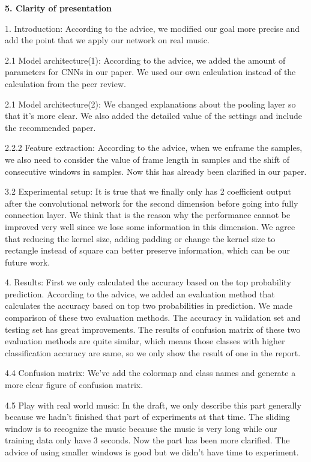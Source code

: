 \documentclass{article}
\begin{document}
\noindent \textbf{5. Clarity of presentation}

1. Introduction: According to the advice, we modified our goal more precise and add the point that we apply our network on real music.

2.1 Model architecture(1): According to the advice, we added the amount of parameters for CNNs in our paper. We used our own calculation instead of the calculation from the peer review.

2.1 Model architecture(2): We changed explanations about the pooling layer so that it's more clear. We also added the detailed value of the settings and include the recommended paper.

2.2.2 Feature extraction: According to the advice, when we enframe the samples, we also need to consider the value of frame length in samples and the shift of consecutive windows in samples. Now this has already been clarified in our paper.

3.2 Experimental setup: It is true that we finally only has 2 coefficient output after the convolutional network for the second dimension before going into fully connection layer. We think that is the reason why the performance cannot be improved very well since we lose some information in this dimension. We agree that reducing the kernel size, adding padding or change the kernel size to rectangle instead of square can better preserve information, which can be our future work.

4. Results: First we only calculated the accuracy based on the top probability prediction. According to the advice, we added an evaluation method that calculates the accuracy based on top two probabilities in prediction. We made comparison of these two evaluation methods. The accuracy in validation set and testing set has great improvements. The results of confusion matrix of these two evaluation methods are quite similar, which means those classes with higher classification accuracy are same, so we only show the result of one in the report.

4.4 Confusion matrix: We've add the colormap and class names and generate a more clear figure of confusion matrix.

4.5 Play with real world music: In the draft, we only describe this part generally because we hadn't finished that part of experiments at that time. The sliding window is to recognize the music because the music is very long while our training data only have 3 seconds. Now the part has been more clarified. The advice of using smaller windows is good but we didn't have time to experiment.



\end{document}
